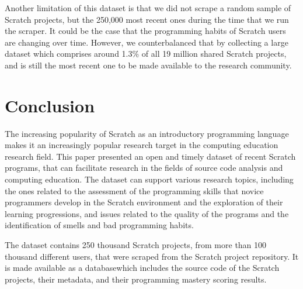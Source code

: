 \documentclass[10pt, conference]{IEEEtran}
\begin{document}
Another limitation of this dataset is that we did not scrape a random sample of Scratch projects, but the 250,000 most recent ones during the time that we run the scraper.
It could be the case that the programming habits of Scratch users are changing over time.
However, we counterbalanced that by collecting a large dataset which comprises around 1.3\% of all 19 million shared Scratch projects, and is still the most recent one to be made available to the research community.

\section{Conclusion}
The increasing popularity of Scratch as an introductory programming language makes it an increasingly popular research target in the computing education research field.
This paper presented an open and timely dataset of recent Scratch programs, that can facilitate research in the fields of source code analysis and computing education.
The dataset can support various research topics, including the ones related to the assessment of the programming skills that novice programmers develop in the Scratch environment and the exploration of their learning progressions, and issues related to the quality of the programs and the identification of smells and bad programming habits.

The dataset contains 250 thousand Scratch projects, from more than 100 thousand different users, that were scraped from the Scratch project repository.
It is made available as a database\footnotemark[\ref{dataseturl}] which includes the source code of the Scratch projects, their metadata, and their programming mastery scoring results.



\end{document}
